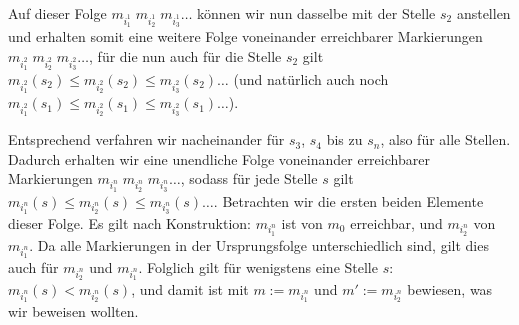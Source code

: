 Auf dieser Folge $m_{i^1_1} \; m_{i^1_2} \; m_{i^1_3}\ldots$ können wir nun dasselbe mit der Stelle $s_2$ anstellen und erhalten somit eine weitere Folge voneinander erreichbarer Markierungen $m_{i^2_1}\; m_{i^2_2}\; m_{i^2_3}\ldots$, für die nun auch für die Stelle $s_2$ gilt $m_{i^2_1} (s_2) \leq m_{i^2_2} (s_2) \leq m_{i^2_3}(s_2)\ldots$ (und natürlich auch noch $m_{i^2_1} (s_1) \leq m_{i^2_2} (s_1) \leq m_{i^2_3}(s_1)\ldots$).

Entsprechend verfahren wir nacheinander für $s_3$, $s_4$ bis zu $s_n$, also für alle Stellen. Dadurch erhalten wir eine unendliche Folge voneinander erreichbarer
Markierungen $m_{i^n_1}\; m_{i^n_2}\; m_{i^n_3}\ldots$, sodass für jede Stelle $s$ gilt $m_{i^n_1} (s) \leq m_{i^n_2} (s) \leq m_{i^n_3}(s)\ldots$. Betrachten wir die ersten beiden Elemente dieser Folge. Es gilt nach Konstruktion: $m_{i^n_1}$ ist von $m_0$ erreichbar, und $m_{i^n_2}$ von $m_{i^n_1}$. Da alle Markierungen in der Ursprungsfolge unterschiedlich sind, gilt dies auch für  $m_{i^n_2}$ und $m_{i^n_1}$. Folglich gilt für wenigstens eine Stelle $s$: $m_{i^n_1} (s) < m_{i^n_2} (s)$, und damit ist mit $m:= m_{i^n_1}$ und $m':= m_{i^n_2}$ bewiesen, was wir beweisen wollten.
